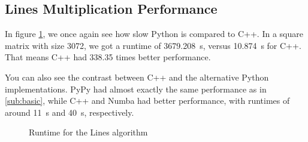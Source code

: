 \documentclass[sigconf,balance,nonacm]{acmart}
\begin{document}
\subsection{Lines Multiplication Performance}
\label{sub:line}

In figure \ref{fig:line}, we once again see how slow Python is compared to C++.
In a square matrix with size 3072, we got a runtime of \qty{3679.208}{\second}, versus \qty{10.874}{\second} for C++.
That means C++ had 338.35 times better performance.

You can also see the contrast between C++ and the alternative Python implementations.
PyPy had almost exactly the same performance as in \ref{sub:basic}, while C++ and Numba had better performance, with runtimes of around \qty{11}{\second} and \qty{40}{\second}, respectively.

\begin{figure}[H]
    \centering
    \caption{Runtime for the Lines algorithm}
    \label{fig:line}
\end{figure}
\end{document}
